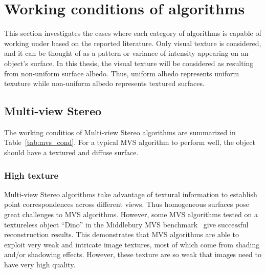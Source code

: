 \section{Working conditions of algorithms}
This section investigates the cases where each category of algorithms is capable of working under based on the reported literature. Only visual texture is considered, and it can be thought of as a pattern or variance of intensity appearing on an object's surface. In this thesis, the visual texture will be considered as resulting from non-uniform surface albedo. Thus, uniform albedo represents uniform texuture while non-uniform albedo represents textured surfaces.

\subsection{Multi-view Stereo}
The working conditios of Multi-view Stereo algorithms are summarized in Table~\ref{tab:mvs_cond}. For a typical MVS algorithm to perform well, the object should have a textured and diffuse surface.

\subsubsection{High texture}
Multi-view Stereo algorithms take advantage of textural information to establish point correspondences across different views. Thus homogeneous surfaces pose great challenges to MVS algorithms. However, some MVS algorithms tested on a textureless object ``Dino'' in the Middlebury MVS benchmark~\cite{seitz2006comparison} give successful reconstruction results. This demonstrates that MVS algorithms are able to exploit very weak and intricate image textures, most of which come from shading and/or shadowing effects. However, these texture are so weak that images need to have very high quality.


